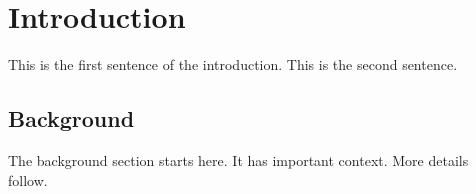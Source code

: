 \section{Introduction}
\label{sec:intro}
This is the first sentence of the introduction.
This is the second sentence.

\subsection{Background}
The background section starts here.
It has important context.
More details follow.
